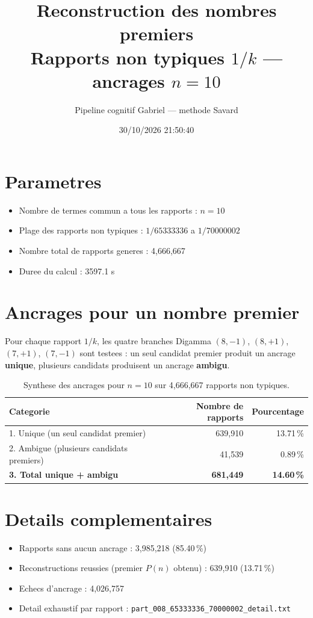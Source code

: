 \documentclass[12pt]{article}
\title{Reconstruction des nombres premiers\\Rapports non typiques $1/k$ --- ancrages $n=10$
}
\author{Pipeline cognitif Gabriel --- methode Savard}
\date{30/10/2026 21:50:40}
\begin{document}
\maketitle

\section*{Parametres}
\begin{itemize}
\item Nombre de termes commun a tous les rapports : $n=10$
\item Plage des rapports non typiques : $1/65333336$ a $1/70000002$
\item Nombre total de rapports generes : 4,666,667
\item Duree du calcul : 3597.1 s
\end{itemize}

\section*{Ancrages pour un nombre premier}

Pour chaque rapport $1/k$, les quatre branches Digamma $(8,-1)$, $(8,+1)$, $(7,+1)$, $(7,-1)$ sont testees : un seul candidat premier produit un ancrage \textbf{unique}, plusieurs candidats produisent un ancrage \textbf{ambigu}.

\begin{table}[h!]
\centering
\caption{Synthese des ancrages pour $n=10$ sur 4,666,667 rapports non typiques.}
\begin{tabular}{lrr}
\toprule
\textbf{Categorie} & \textbf{Nombre de rapports} & \textbf{Pourcentage} \\
\midrule
1. Unique (un seul candidat premier) & 639,910 & 13.71\,\% \\
2. Ambigue (plusieurs candidats premiers) & 41,539 & 0.89\,\% \\
\midrule
\textbf{3. Total unique + ambigu} & \textbf{681,449} & \textbf{14.60\,\%} \\
\bottomrule
\end{tabular}
\end{table}

\section*{Details complementaires}
\begin{itemize}
\item Rapports sans aucun ancrage : 3,985,218 (85.40\,\%)
\item Reconstructions reussies (premier $P(n)$ obtenu) : 639,910 (13.71\,\%)
\item Echecs d'ancrage : 4,026,757
\item Detail exhaustif par rapport : \texttt{part_008_65333336_70000002_detail.txt}
\end{itemize}
\end{document}
